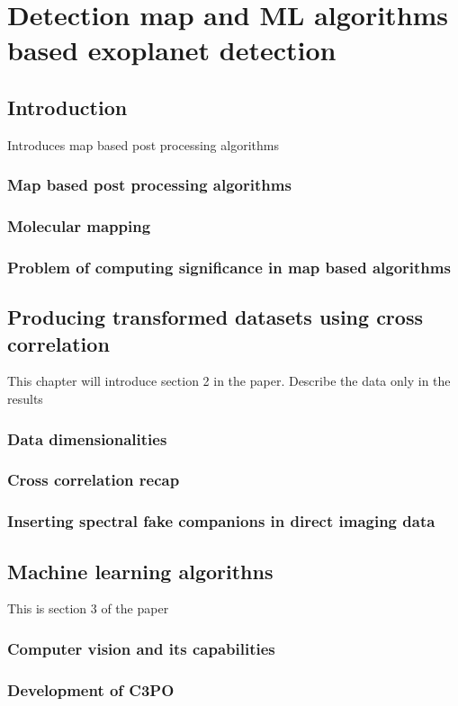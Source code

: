 \part{Detection map and ML algorithms based exoplanet detection}
\startcontents[chapters]
\printmyminitoc{}
\chapter{Introduction}
Introduces map based post processing algorithms
\section{Map based post processing algorithms}
\section{Molecular mapping }
\section{Problem of computing significance in map based algorithms}

\chapter{Producing transformed datasets using cross correlation }
This chapter will introduce section 2 in the paper. Describe the data only in the results
\section{Data dimensionalities }
\section{Cross correlation recap}
\section{Inserting spectral fake companions in direct imaging data}

\chapter{Machine learning algorithns}
This is section 3 of the paper
\section{Computer vision and its capabilities}
\section{Development of C3PO}
